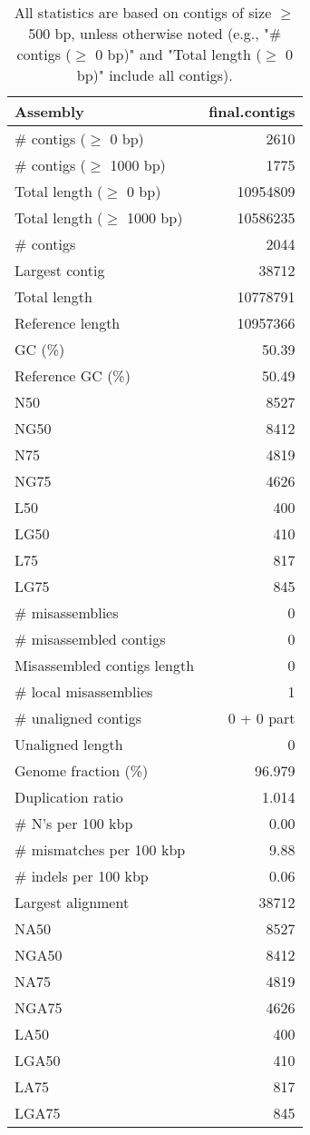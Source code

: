 \documentclass[12pt,a4paper]{article}
\begin{document}
\begin{table}[ht]
\begin{center}
\caption{All statistics are based on contigs of size $\geq$ 500 bp, unless otherwise noted (e.g., "\# contigs ($\geq$ 0 bp)" and "Total length ($\geq$ 0 bp)" include all contigs).}
\begin{tabular}{|l*{1}{|r}|}
\hline
Assembly & final.contigs \\ \hline
\# contigs ($\geq$ 0 bp) & 2610 \\ \hline
\# contigs ($\geq$ 1000 bp) & 1775 \\ \hline
Total length ($\geq$ 0 bp) & 10954809 \\ \hline
Total length ($\geq$ 1000 bp) & 10586235 \\ \hline
\# contigs & 2044 \\ \hline
Largest contig & 38712 \\ \hline
Total length & 10778791 \\ \hline
Reference length & 10957366 \\ \hline
GC (\%) & 50.39 \\ \hline
Reference GC (\%) & 50.49 \\ \hline
N50 & 8527 \\ \hline
NG50 & 8412 \\ \hline
N75 & 4819 \\ \hline
NG75 & 4626 \\ \hline
L50 & 400 \\ \hline
LG50 & 410 \\ \hline
L75 & 817 \\ \hline
LG75 & 845 \\ \hline
\# misassemblies & 0 \\ \hline
\# misassembled contigs & 0 \\ \hline
Misassembled contigs length & 0 \\ \hline
\# local misassemblies & 1 \\ \hline
\# unaligned contigs & 0 + 0 part \\ \hline
Unaligned length & 0 \\ \hline
Genome fraction (\%) & 96.979 \\ \hline
Duplication ratio & 1.014 \\ \hline
\# N's per 100 kbp & 0.00 \\ \hline
\# mismatches per 100 kbp & 9.88 \\ \hline
\# indels per 100 kbp & 0.06 \\ \hline
Largest alignment & 38712 \\ \hline
NA50 & 8527 \\ \hline
NGA50 & 8412 \\ \hline
NA75 & 4819 \\ \hline
NGA75 & 4626 \\ \hline
LA50 & 400 \\ \hline
LGA50 & 410 \\ \hline
LA75 & 817 \\ \hline
LGA75 & 845 \\ \hline
\end{tabular}
\end{center}
\end{table}
\end{document}
